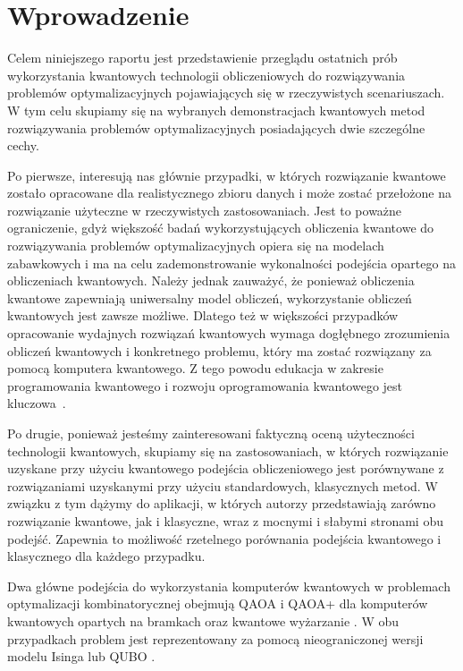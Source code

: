 \documentclass[a4paper,11pt]{article}
\begin{document}
\section{Wprowadzenie}

Celem niniejszego raportu jest przedstawienie przeglądu ostatnich prób wykorzystania kwantowych technologii obliczeniowych do rozwiązywania problemów optymalizacyjnych pojawiających się w rzeczywistych scenariuszach. W tym celu skupiamy się na wybranych demonstracjach kwantowych metod rozwiązywania problemów optymalizacyjnych posiadających dwie szczególne cechy.

Po pierwsze, interesują nas głównie przypadki, w których rozwiązanie kwantowe zostało opracowane dla realistycznego zbioru danych i może zostać przełożone na rozwiązanie użyteczne w rzeczywistych zastosowaniach. Jest to poważne ograniczenie, gdyż większość badań wykorzystujących obliczenia kwantowe do rozwiązywania problemów optymalizacyjnych opiera się na modelach zabawkowych i ma na celu zademonstrowanie wykonalności podejścia opartego na obliczeniach kwantowych. Należy jednak zauważyć, że ponieważ obliczenia kwantowe zapewniają uniwersalny model obliczeń, wykorzystanie obliczeń kwantowych jest zawsze możliwe. Dlatego też w większości przypadków opracowanie wydajnych rozwiązań kwantowych wymaga dogłębnego zrozumienia obliczeń kwantowych i konkretnego problemu, który ma zostać rozwiązany za pomocą komputera kwantowego. Z tego powodu edukacja w zakresie programowania kwantowego i rozwoju oprogramowania kwantowego jest kluczowa~\cite{salehi2022computer}.

Po drugie, ponieważ jesteśmy zainteresowani faktyczną oceną użyteczności technologii kwantowych, skupiamy się na zastosowaniach, w których rozwiązanie uzyskane przy użyciu kwantowego podejścia obliczeniowego jest porównywane z rozwiązaniami uzyskanymi przy użyciu standardowych, klasycznych metod. W związku z tym dążymy do aplikacji, w których autorzy przedstawiają zarówno rozwiązanie kwantowe, jak i klasyczne, wraz z mocnymi i słabymi stronami obu podejść. Zapewnia to możliwość rzetelnego porównania podejścia kwantowego i klasycznego dla każdego przypadku.


Dwa główne podejścia do wykorzystania komputerów kwantowych w problemach optymalizacji kombinatorycznej obejmują QAOA \cite{farhi2014quantum} i QAOA+ \cite{hadfield2019quantum} dla komputerów kwantowych opartych na bramkach oraz kwantowe wyżarzanie \cite{canivell2021startup}. W obu przypadkach problem jest reprezentowany za pomocą nieograniczonej wersji modelu Isinga \cite{lucas2014ising} lub QUBO \cite{glover2018tutorial}. 
\end{document}
